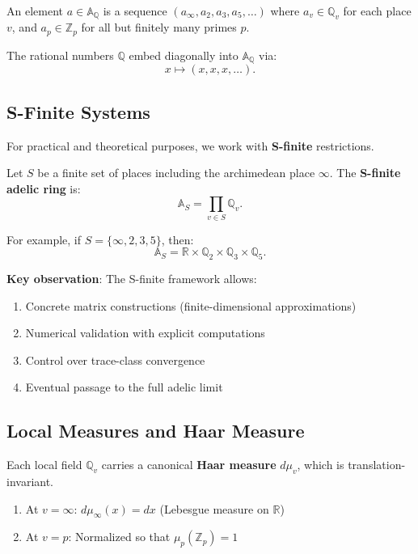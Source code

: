 An element $a \in \mathbb{A}_\mathbb{Q}$ is a sequence $(a_\infty, a_2, a_3, a_5, \ldots)$ where $a_v \in \mathbb{Q}_v$ for each place $v$, and $a_p \in \mathbb{Z}_p$ for all but finitely many primes $p$.

The rational numbers $\mathbb{Q}$ embed diagonally into $\mathbb{A}_\mathbb{Q}$ via:
\[
x \mapsto (x, x, x, \ldots).
\]

\subsection{S-Finite Systems}

For practical and theoretical purposes, we work with \textbf{S-finite} restrictions.

\begin{definition}
\label{def:s_finite}
Let $S$ be a finite set of places including the archimedean place $\infty$. The \textbf{S-finite adelic ring} is:
\[
\mathbb{A}_S = \prod_{v \in S} \mathbb{Q}_v.
\]
\end{definition}

For example, if $S = \{\infty, 2, 3, 5\}$, then:
\[
\mathbb{A}_S = \mathbb{R} \times \mathbb{Q}_2 \times \mathbb{Q}_3 \times \mathbb{Q}_5.
\]

\textbf{Key observation}: The S-finite framework allows:
\begin{enumerate}
\item Concrete matrix constructions (finite-dimensional approximations)
\item Numerical validation with explicit computations
\item Control over trace-class convergence
\item Eventual passage to the full adelic limit
\end{enumerate}

\subsection{Local Measures and Haar Measure}

Each local field $\mathbb{Q}_v$ carries a canonical \textbf{Haar measure} $d\mu_v$, which is translation-invariant.

\begin{definition}
\begin{enumerate}
\item At $v = \infty$: $d\mu_\infty(x) = dx$ (Lebesgue measure on $\mathbb{R}$)
\item At $v = p$: Normalized so that $\mu_p(\mathbb{Z}_p) = 1$
\end{enumerate}
\end{definition}

